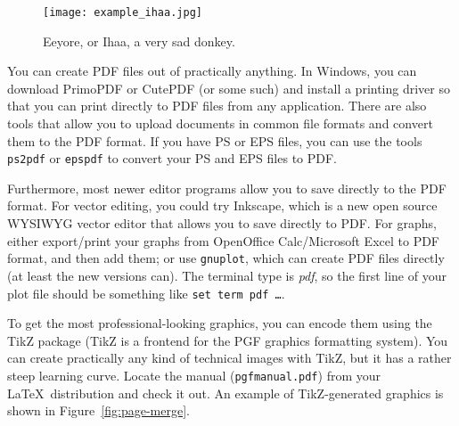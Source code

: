 \documentclass[12pt,a4paper,oneside,pdftex]{report}
\begin{document}
\begin{figure}[ht]
  \begin{center}
    \texttt{[image: example\_ihaa.jpg]}
    \caption{Eeyore, or Ihaa, a very sad donkey.}
    \label{fig:eeyore}
  \end{center}
\end{figure}

You can create PDF files out of practically anything.
In Windows, you can download PrimoPDF or CutePDF (or some such) and install a
printing driver so that you can print directly to PDF files from any
application. There are also tools that allow you to upload documents in common
file formats and convert them to the PDF format.
If you have PS or EPS files, you can use the tools \texttt{ps2pdf} or
\texttt{epspdf} to convert your PS and EPS files to PDF\@.



Furthermore, most newer editor programs allow you to save directly to the PDF
format. For vector editing, you could try Inkscape, which is a new open source
WYSIWYG vector editor that allows you to save directly to PDF\@.
For graphs, either export/print your graphs from OpenOffice Calc/Microsoft
Excel to PDF format, and then add them; or use \texttt{gnuplot}, which can
create PDF files directly (at least the new versions can).
The terminal type is \emph{pdf}, so the first line of your plot file should be
something like \texttt{set term pdf \ldots}.

To get the most professional-looking graphics, you can encode them using the
TikZ package (TikZ is a frontend for the PGF graphics formatting system).
You can create practically any kind of technical images with TikZ, but it has a
rather steep learning curve. Locate the manual (\texttt{pgfmanual.pdf}) from
your \LaTeX\ distribution and check it out. An example of TikZ-generated
graphics is shown in Figure~\ref{fig:page-merge}.
\end{document}
